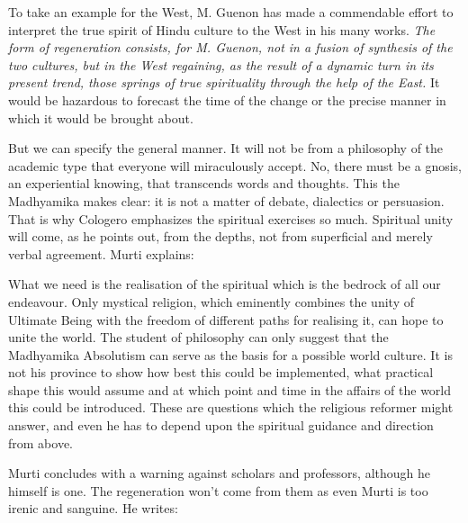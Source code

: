 \begin{quotex}
To take an example for the West, M. Guenon has made a commendable effort to interpret the true spirit of Hindu culture to the West in his many works. \emph{The form of regeneration consists, for M. Guenon, not in a fusion of synthesis of the two cultures, but in the West regaining, as the result of a dynamic turn in its present trend, those springs of true spirituality through the help of the East.} It would be hazardous to forecast the time of the change or the precise manner in which it would be brought about.

\end{quotex}
But we can specify the general manner. It will not be from a philosophy of the academic type that everyone will miraculously accept. No, there must be a gnosis, an experiential knowing, that transcends words and thoughts. This the Madhyamika makes clear: it is not a matter of debate, dialectics or persuasion. That is why Cologero emphasizes the spiritual exercises so much. Spiritual unity will come, as he points out, from the depths, not from superficial and merely verbal agreement. Murti explains:

\begin{quotex}
What we need is the realisation of the spiritual which is the bedrock of all our endeavour. Only mystical religion, which eminently combines the unity of Ultimate Being with the freedom of different paths for realising it, can hope to unite the world. The student of philosophy can only suggest that the Madhyamika Absolutism can serve as the basis for a possible world culture. It is not his province to show how best this could be implemented, what practical shape this would assume and at which point and time in the affairs of the world this could be introduced. These are questions which the religious reformer might answer, and even he has to depend upon the spiritual guidance and direction from above.

\end{quotex}
Murti concludes with a warning against scholars and professors, although he himself is one. The regeneration won't come from them as even Murti is too irenic and sanguine. He writes:

